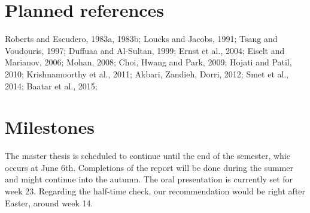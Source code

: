\documentclass{article}
\begin{document}
\pagebreak
\section*{Planned references}
Roberts and Escudero, 1983a, 1983b; Loucks and Jacobs, 1991; Tsang and Voudouris, 1997; Duffuaa and Al-Sultan, 1999; Ernst et al., 2004; Eiselt and Marianov, 2006; Mohan, 2008; Choi, Hwang and Park, 2009; Hojati and Patil, 2010; Krishnamoorthy et al., 2011; Akbari, Zandieh, Dorri, 2012; Smet et al., 2014; Baatar et al., 2015;

\section*{Milestones}
The master thesis is scheduled to continue until the end of the semester, whic occurs at June 6th. Completions of the report will be done during the summer and might continue into the autumn. The oral presentation is currently set for week 23. Regarding the half-time check, our recommendation would be right after Easter, around week 14.
\end{document}
